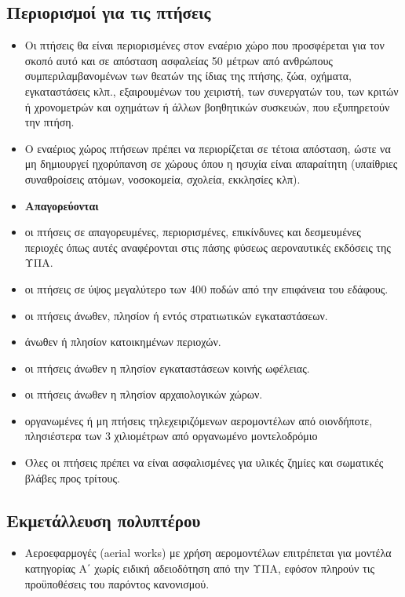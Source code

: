 \documentclass[a4paper, 12pt, twoside]{report}
\begin{document}
{{{{{{		\subsection{Περιορισμοί για τις πτήσεις}			
			\begin{itemize}
				\item Οι πτήσεις θα είναι περιορισμένες στον εναέριο χώρο που προσφέρεται για τον σκοπό αυτό και σε απόσταση ασφαλείας 50 μέτρων από ανθρώπους συμπεριλαμβανομένων των θεατών της ίδιας της πτήσης, ζώα, οχήματα, εγκαταστάσεις κλπ., εξαιρουμένων του χειριστή, των συνεργατών του, των κριτών ή χρονομετρών και οχημάτων ή άλλων βοηθητικών συσκευών, που
εξυπηρετούν την πτήση.
				\item Ο εναέριος χώρος πτήσεων πρέπει να περιορίζεται σε τέτοια απόσταση, ώστε να μη δημιουργεί ηχορύπανση σε χώρους όπου η ησυχία είναι απαραίτητη (υπαίθριες συναθροίσεις ατόμων, νοσοκομεία, σχολεία,
εκκλησίες κλπ).
				\item \textbf{Απαγορεύονται}
				\item οι πτήσεις σε απαγορευμένες, περιορισμένες, επικίνδυνες και δεσμευμένες περιοχές όπως αυτές αναφέρονται στις πάσης φύσεως αεροναυτικές εκδόσεις της ΥΠΑ.
				\item οι πτήσεις σε ύψος μεγαλύτερο των 400 ποδών από την επιφάνεια του εδάφους.
				\item οι πτήσεις άνωθεν, πλησίον ή εντός στρατιωτικών εγκαταστάσεων.
				\item άνωθεν ή πλησίον κατοικημένων περιοχών.
				\item οι πτήσεις άνωθεν η πλησίον εγκαταστάσεων κοινής ωφέλειας.
				\item οι πτήσεις άνωθεν η πλησίον αρχαιολογικών χώρων.
				\item οργανωμένες ή μη πτήσεις τηλεχειριζόμενων αερομοντέλων από οιονδήποτε, πλησιέστερα των 3 χιλιομέτρων από οργανωμένο μοντελοδρόμιο
				\item Όλες οι πτήσεις πρέπει να είναι ασφαλισμένες για υλικές ζημίες και σωματικές βλάβες προς τρίτους.
			\end{itemize}
			
		\subsection{Εκμετάλλευση πολυπτέρου}
			\begin{itemize}
				\item Αεροεφαρμογές (aerial works) με χρήση αερομοντέλων επιτρέπεται για μοντέλα κατηγορίας Α΄ χωρίς ειδική αδειοδότηση από την ΥΠΑ, εφόσον πληρούν τις προϋποθέσεις του παρόντος κανονισμού.
			\end{itemize}
			
}}}}}}
\end{document}
